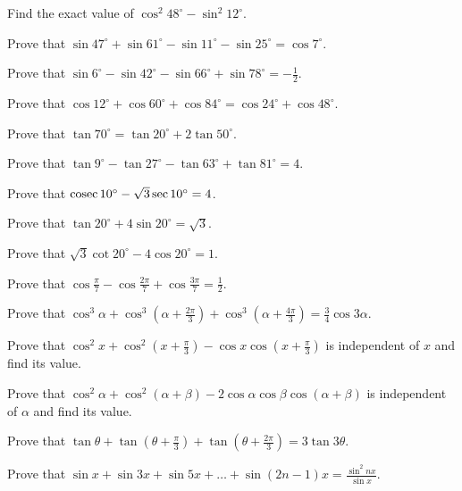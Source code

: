 \item Find the exact value of $\cos^2 48^\circ - \sin^2 12^\circ$.

\item Prove that $\sin 47^\circ + \sin 61^\circ - \sin 11^\circ - \sin 25^\circ = \cos 7^\circ$.

\item Prove that $\sin 6^\circ - \sin 42^\circ - \sin 66^\circ + \sin 78^\circ = -\frac{1}{2}$.

\item Prove that $\cos 12^\circ + \cos 60^\circ + \cos 84^\circ = \cos 24^\circ + \cos 48^\circ$.

\item Prove that $\tan 70^\circ = \tan 20^\circ + 2\tan 50^\circ$.

\item Prove that $\tan 9^\circ - \tan 27^\circ - \tan 63^\circ + \tan 81^\circ = 4$.

\item Prove that ${\rm cosec}\, 10^\circ - \sqrt{3}\sec 10^\circ = 4$.

\item Prove that $\tan 20^\circ + 4\sin 20^\circ = \sqrt{3}$.

\item Prove that $\sqrt{3}\cot 20^\circ - 4\cos 20^\circ = 1$.

\item Prove that $\cos\frac{\pi}{7} - \cos\frac{2\pi}{7} + \cos\frac{3\pi}{7} = \frac{1}{2}$.

\item Prove that $\cos^3\alpha + \cos^3\left(\alpha + \frac{2\pi}{3}\right) + \cos^3\left(\alpha + \frac{4\pi}{3}\right) =
    \frac{3}{4}\cos 3\alpha$.

\item Prove that $\cos^2 x + \cos^2\left(x + \frac{\pi}{3}\right) - \cos x\cos\left(x + \frac{\pi}{3}\right)$ is independent
    of $x$ and find its value.

\item Prove that $\cos^2\alpha + \cos^2(\alpha + \beta) - 2\cos\alpha\cos\beta\cos(\alpha + \beta)$ is independent of $\alpha$
    and find its value.

\item Prove that $\tan\theta + \tan\left(\theta + \frac{\pi}{3}\right) + \tan\left(\theta + \frac{2\pi}{3}\right) =
    3\tan 3\theta$.

\item Prove that $\sin x + \sin 3x + \sin 5x + \ldots + \sin(2n - 1)x = \frac{\sin^2 nx}{\sin x}$.

